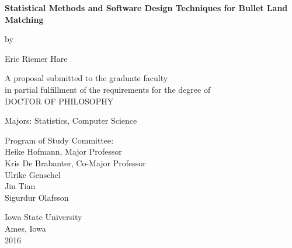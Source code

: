 \begin{center}

\textbf{Statistical Methods and Software Design Techniques for Bullet Land Matching}

\vspace{.25in}

by

\vspace{.25in}

Eric Riemer Hare

\vspace{.5in}

A proposal submitted to the graduate faculty \\ in partial fulfillment of the requirements for the degree of \\ DOCTOR OF PHILOSOPHY

\vspace{1in}

Majors: Statistics, Computer Science

\vspace{.5in}

Program of Study Committee: \\
Heike Hofmann, Major Professor \\
Kris De Brabanter, Co-Major Professor \\
Ulrike Genschel \\
Jin Tian \\
Sigurdur Olafsson

\vspace{.5in}

Iowa State University \\
Ames, Iowa \\
2016

\end{center}
